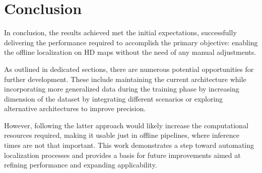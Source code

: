 \NoBgThispage
\chapter*{Conclusion}

In conclusion, the results achieved met the initial expectations, successfully delivering the performance required to accomplish the primary objective: enabling the offline localization on HD maps without the need of any manual adjustments.

As outlined in dedicated sections, there are numerous potential opportunities for further development. These include maintaining the current architecture while incorporating more generalized data during the training phase by increasing dimension of the dataset by integrating different scenarios or exploring alternative architectures to improve precision. 

However, following the latter approach would likely increase the computational resources required, making it usable just in offline pipelines, where inference times are not that important.
This work demonstrates a step toward automating localization processes and provides a basis for future improvements aimed at refining performance and expanding applicability.
